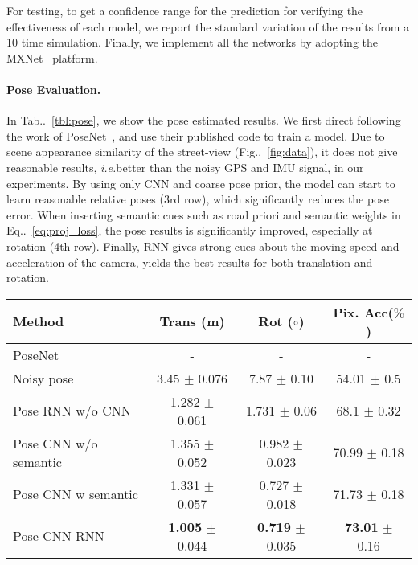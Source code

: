 \documentclass[10pt,twocolumn,letterpaper]{article}
\makeatletter
\newcommand{\figref}[1]{Fig\onedot~\ref{#1}}
\newcommand{\equref}[1]{Eq\onedot~\eqref{#1}}
\newcommand{\tabref}[1]{Tab\onedot~\ref{#1}}
\DeclareRobustCommand\onedot{\futurelet\@let@token\@onedot}
\def\onedot{\ifx\@let@token.\else.\null\fi\xspace}
\def\ie{\emph{i.e.}}
\makeatother
\begin{document}
For testing, to get a confidence range for the prediction for verifying the effectiveness of each model, we report the standard variation of the results from a 10 time simulation. Finally, we implement all the networks by adopting the MXNet~\cite{ChenLLLWWXXZZ15} platform. 


\paragraph{Pose Evaluation.}
In \tabref{tbl:pose}, we show the pose estimated results. We first direct following the work of PoseNet~\cite{Kendall_2015_ICCV,kendall2017geometric}, and use their published code to train a model. Due to scene appearance similarity of the street-view (\figref{fig:data}), it does not give reasonable results, \ie better than the noisy GPS and IMU signal, in our experiments. 
By using only CNN and coarse pose prior, the model can start to learn reasonable relative poses (3rd row), which significantly reduces the pose error. When inserting semantic cues such as road priori and semantic weights in \equref{eq:proj_loss}, the pose results is significantly improved, especially at rotation (4th row). 
Finally, RNN gives strong cues about the moving speed and acceleration of the camera, yields the best results for both translation and rotation. 

\begin{table*}
\center
\small
\begin{tabular}{lccc}
\toprule[0.1 em]
Method & Trans (m) & Rot ($\circ$) & Pix. Acc($\%$)\\ 
\hline 
PoseNet~\cite{kendall2017geometric} & -  & -  & -  \\
Noisy pose & 3.45 $\pm$ 0.076 & 7.87 $\pm$ 0.10 & 54.01 $\pm$ 0.5 \\
Pose RNN w/o CNN & 1.282 $\pm$ 0.061  & 1.731 $\pm$ 0.06 &  68.1 $\pm$ 0.32 \\
Pose CNN w/o semantic & 1.355 $\pm$ 0.052  & 0.982 $\pm$ 0.023 & 70.99 $\pm$ 0.18 \\
Pose CNN w semantic & 1.331 $\pm$ 0.057  & 0.727 $\pm$ 0.018 & 71.73 $\pm$ 0.18  \\
Pose CNN-RNN  & \textbf{1.005} $\pm$ 0.044  & \textbf{0.719} $\pm$ 0.035  & \textbf{73.01} $\pm$ 0.16  \\
\toprule[0.1 em]
\end{tabular}
\caption{Compare the accuracy of different settings for pose estimation. 
Noisy pose indicates the input signal from GPS, IMU. 
The number after $\pm$ indicates the std from 10 simulations. We can see the improvement is statistically significant.}
\label{tbl:pose}
\vspace{-0.3\baselineskip}
\end{table*}
\end{document}
